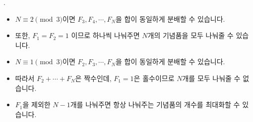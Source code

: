 \begin{frame}{\probno{}. \probtitle{}}
    \begin{itemize}
        \item $N \equiv 2 \pmod 3$이면 $F_3, F_4, \cdots, F_N$을 합이 동일하게 분배할 수 있습니다.
        \item 또한, $F_1 = F_2 = 1$ 이므로 하나씩 나눠주면 $N$개의 기념품을 모두 나눠줄 수 있습니다.
        \vspace{5mm}
        \item $N \equiv 1 \pmod 3$이면 $F_2, F_3, \cdots, F_N$을 합이 동일하게 분배할 수 있습니다.
        \item 따라서 $F_2 + \cdots + F_N$은 짝수인데, $F_1 = 1$은 홀수이므로 $N$개를 모두 나눠줄 수 없습니다.
        \item $F_1$을 제외한 $N-1$개를 나눠주면 항상 나눠주는 기념품의 개수를 최대화할 수 있습니다.
    \end{itemize}
\end{frame}